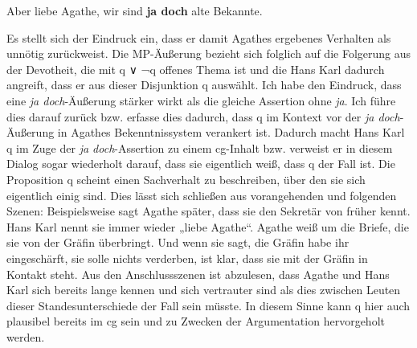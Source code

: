\begin{exe}
	\ex\label{453} 
	Aber liebe Agathe, wir sind \textbf{ja doch} alte Bekannte.
\end{exe}\largerpage[-1]
Es stellt sich der Eindruck ein, dass er damit Agathes ergebenes Verhalten als unnötig zurückweist. Die MP-Äußerung bezieht sich folglich auf die Folgerung aus der Devotheit, die mit q ∨ ¬q offenes Thema ist und die Hans Karl dadurch angreift, dass er aus dieser Disjunktion q auswählt. Ich habe den Eindruck, dass eine \textit{ja doch}-Äußerung stärker wirkt als die gleiche Assertion ohne \textit{ja}. Ich führe dies darauf zurück bzw. erfasse dies dadurch, dass q im Kontext vor der \textit{ja doch}-Äußerung in Agathes Bekenntnissystem verankert ist. Dadurch macht Hans Karl q im Zuge der \textit{ja doch}-Assertion zu einem cg-Inhalt bzw. verweist er in diesem Dialog sogar wiederholt darauf, dass sie eigentlich weiß, dass q der Fall ist. Die Proposition q scheint einen Sachverhalt zu beschreiben, über den sie sich eigentlich einig sind. Dies lässt sich schließen aus vorangehenden und folgenden Szenen: Beispielsweise sagt Agathe später, dass sie den Sekretär von früher kennt. Hans Karl nennt sie immer wieder „liebe Agathe“. Agathe weiß um die Briefe, die sie von der Gräfin überbringt. Und wenn sie sagt, die Gräfin habe ihr eingeschärft, sie solle nichts verderben, ist klar, dass sie mit der Gräfin in Kontakt steht. Aus den Anschlussszenen ist abzulesen, dass Agathe und Hans Karl sich bereits lange kennen und sich vertrauter sind als dies zwischen Leuten dieser Standesunterschiede der Fall sein müsste. In diesem Sinne kann q hier auch plausibel bereits im cg sein und zu Zwecken der Argumentation hervorgeholt werden.

